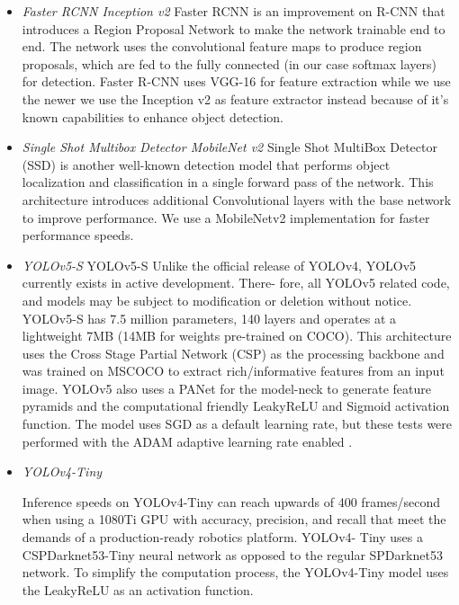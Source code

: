 \documentclass[a4paper,fleqn]{cas-dc}
\begin{document}
\begin{itemize}

\item \textit{Faster RCNN Inception v2}
Faster RCNN \cite{10.5555/2969239.2969250} is an improvement on R-CNN \cite{DBLP:journals/corr/GirshickDDM13} that
introduces a Region Proposal Network to make the network trainable end to end. The network uses the convolutional feature maps to produce
region proposals, which are fed to the fully connected (in our case softmax layers) for detection. Faster R-CNN uses VGG-16 \cite{DBLP:journals/corr/SimonyanZ14a} for feature extraction while we use the newer we use the Inception v2 \cite{tensorflowmodelgarden2020} as feature extractor instead because of it's known capabilities to enhance object detection.

\item \textit{Single Shot Multibox Detector MobileNet v2}
Single Shot MultiBox Detector (SSD) \cite{DBLP:journals/corr/abs-1805-09501} is another well-known
detection model that performs object localization and
classification in a single forward pass of the network. This architecture introduces additional Convolutional layers with the base network to improve performance. We use a MobileNetv2 implementation \cite{NAGRATH2021102692} for faster performance speeds. 

\item \textit{YOLOv5-S} \cite{Jocher_Stoken_Borovec_NanoCode012_ChristopherSTAN_Changyu_Laughing_Tkianai_Hogan_Lorenzomammana_et_al._2020}
YOLOv5-S Unlike the official release of YOLOv4, YOLOv5 currently exists in active development. There- fore, all YOLOv5 related code, and models may be subject to modification or deletion without notice. YOLOv5-S has 7.5 million parameters, 140 layers and operates at a lightweight 7MB (14MB for weights pre-trained on COCO). This architecture uses the Cross Stage Partial Network (CSP) \cite{wang2019cspnet} as the processing backbone and was trained on MSCOCO to extract rich/informative features from an input image. YOLOv5 also uses a PANet \cite{liu2018path} for the model-neck to generate feature pyramids and the computational friendly LeakyReLU and Sigmoid activation function. The model uses SGD as a default learning rate, but these tests were performed with the ADAM adaptive learning rate enabled \cite{kingma2017adam}.

\item \textit{YOLOv4-Tiny} \cite{bochkovskiy2020yolov4}

Inference speeds on YOLOv4-Tiny can reach upwards of 400 frames/second when using a 1080Ti GPU with accuracy, precision, and recall that meet the demands of a production-ready robotics platform. YOLOv4- Tiny uses a CSPDarknet53-Tiny neural network as opposed to the regular SPDarknet53 network. To simplify the computation process, the YOLOv4-Tiny model uses the LeakyReLU as an activation function.

\end{itemize}
\end{document}
